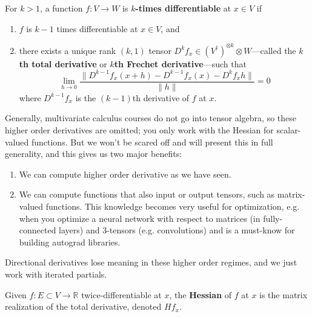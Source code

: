   \begin{definition}
    For $k > 1$, a function $f: V \longrightarrow W$ is \textbf{$k$-times differentiable} at $x \in V$ if 
    \begin{enumerate}
      \item $f$ is $k-1$ times differentiable at $x \in V$, and 
      \item  there exists a unique rank $(k, 1)$ tensor $D^k f_x \in (V^\dagger)^{\otimes k} \otimes W$---called the \textbf{$k$th total derivative} or \textbf{$k$th Frechet derivative}---such that 
      \begin{equation}
        \lim_{h \to 0} \frac{\| D^{k-1} f_x (x + h) - D^{k-1} f_x (x) - D^k f_x h \|}{\| h \|} = 0 
      \end{equation} 
      where $D^{k-1} f_x$ is the $(k-1)$th derivative of $f$ at $x$.
    \end{enumerate}
  \end{definition}

  Generally, multivariate calculus courses do not go into tensor algebra, so these higher order derivatives are omitted; you only work with the Hessian for scalar-valued functions. But we won't be scared off and will present this in full generality, and this gives us two major benefits: 
  \begin{enumerate}
    \item We can compute higher order derivative as we have seen. 
    \item We can compute functions that also input or output tensors, such as matrix-valued functions. This knowledge becomes very useful for optimization, e.g. when you optimize a neural network with respect to matrices (in fully-connected layers) and 3-tensors (e.g. convolutions) and is a must-know for building autograd libraries.  
  \end{enumerate} 

  \begin{definition}
    
  \end{definition}

  Directional derivatives lose meaning in these higher order regimes, and we just work with iterated partials. 

  \begin{definition}[Hessian]
    Given $f: E \subset V \to \mathbb{R}$ twice-differentiable at $x$, the \textbf{Hessian} of $f$ at $x$ is the matrix realization of the total derivative, denoted $Hf_x$. 
  \end{definition}

